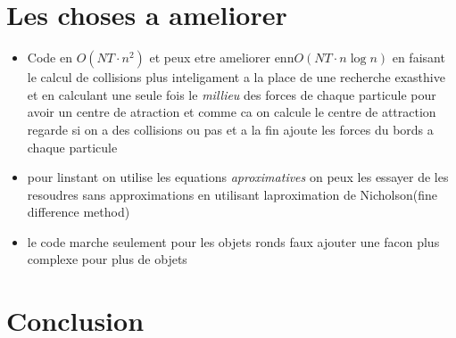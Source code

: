 \documentclass[a4paper, 11pt, oneside]{article} %
\begin{document}
\section{Les choses a ameliorer}
    \begin{itemize}
        \item Code en $O(NT\cdot n^2)$ et peux etre ameliorer enn$O(NT\cdot n\log n)$ en faisant le calcul de collisions plus inteligament a la place de une recherche exasthive et en calculant une seule fois le \textit{millieu} des forces de chaque particule pour avoir un centre de atraction et comme ca on calcule le centre de attraction regarde si on a des collisions ou pas et a la fin ajoute les forces du bords a chaque particule
        \item pour linstant on utilise les equations \textit{aproximatives} on peux les essayer de les resoudres sans approximations en utilisant laproximation de Nicholson(fine difference method)
        \item le code marche seulement pour les objets ronds faux ajouter une facon plus complexe pour plus de objets
    \end{itemize}
\section*{Conclusion}

\newpage
\thispagestyle{empty}
\nocite{*}
\printbibliography[title = Bibliographie]
\end{document}
